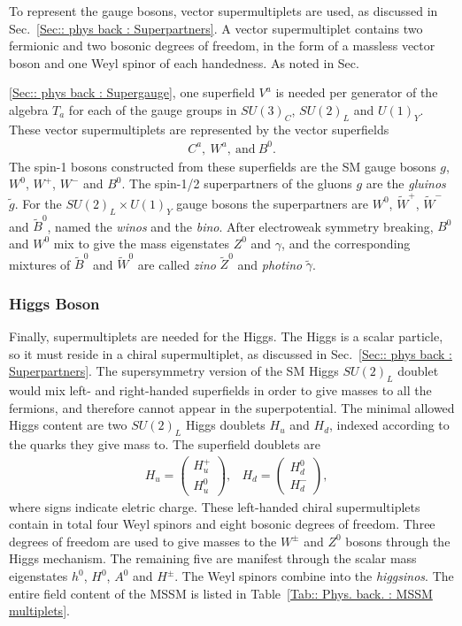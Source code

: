 \documentclass[twoside,english]{uiofysmaster}
\begin{document}
To represent the gauge bosons, vector supermultiplets are used, as discussed in Sec.~\ref{Sec:: phys back : Superpartners}. A vector supermultiplet contains two fermionic and two bosonic degrees of freedom, in the form of a massless vector boson and one Weyl spinor of each handedness. As noted in Sec.~{\ref{Sec:: phys back : Supergauge}, one superfield $V^a$ is needed per generator of the algebra $T_a$ for each of the gauge groups in $SU(3)_C$, $SU(2)_L$ and $U(1)_Y$. These vector supermultiplets are represented by the vector superfields
\begin{align}
C^a, ~W^a, ~\mathrm{and}~B^0.
\end{align}
The spin-1 bosons constructed from these superfields are the SM gauge bosons $g$, $W^0$, $W^+$, $W^-$ and $B^0$. The spin-1/2 superpartners of the gluons $g$ are the \textit{gluinos} $\widetilde{g}$. For the $SU(2)_L \times U(1)_Y$ gauge bosons the superpartners are $W^0$, $\widetilde{W}^+$, $\widetilde{W}^-$ and $\widetilde{B}^0$, named the \textit{winos} and the \textit{bino}. After electroweak symmetry breaking, $B^0$ and $W^0$ mix to give the mass eigenstates $Z^0$ and $\gamma$, and the corresponding mixtures of $\widetilde{B}^0$ and $\widetilde{W}^0$ are called \textit{zino} $\widetilde{Z}^0$ and \textit{photino} $\widetilde{\gamma}$. 

\subsubsection{Higgs Boson}

Finally, supermultiplets are needed for the Higgs. The Higgs is a scalar particle, so it must reside in a chiral supermultiplet, as discussed in Sec.~\ref{Sec:: phys back : Superpartners}. The supersymmetry version of the SM Higgs $SU(2)_L$ doublet would mix left- and right-handed superfields in order to give masses to all the fermions, and therefore cannot appear in the superpotential. The minimal allowed Higgs content are two $SU(2)_L$ Higgs doublets $H_u$ and $H_d$, indexed according to the quarks they give mass to. The superfield doublets are
\begin{align}
&H_u = \begin{pmatrix}
H_u^+\\
H_u^0
\end{pmatrix},
&H_d = \begin{pmatrix}
H_d^0\\
H_d^-
\end{pmatrix},
\end{align}
where signs indicate eletric charge. These left-handed chiral supermultiplets contain in total four Weyl spinors and eight bosonic degrees of freedom. Three degrees of freedom are used to give masses to the $W^{\pm}$ and $Z^0$ bosons through the Higgs mechanism. The remaining five are manifest through the scalar mass eigenstates $h^0$, $H^0$, $A^0$ and $H^{\pm}$. The Weyl spinors combine into the \textit{higgsinos}. The entire field content of the MSSM is listed in Table~\ref{Tab:: Phys. back. : MSSM multiplets}.

}
\end{document}
